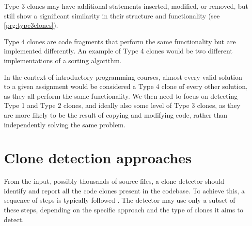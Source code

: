 Type 3 clones may have additional statements inserted, modified, or removed, but still show a significant similarity in their structure and functionality (see \autoref{prg:type3clones}).

Type 4 clones are code fragments that perform the same functionality but are implemented differently.
An example of Type 4 clones would be two different implementations of a sorting algorithm.

In the context of introductory programming courses, almost every valid solution to a given assignment would be considered a Type 4 clone of every other solution, as they all perform the same functionality.
We then need to focus on detecting Type 1 and Type 2 clones, and ideally also some level of Type 3 clones, as they are more likely to be the result of copying and modifying code, rather than independently solving the same problem.

\section{Clone detection approaches}

From the input, possibly thousands of source files, a clone detector should identify and report all the code clones present in the codebase.
To achieve this, a sequence of steps is typically followed \cite{roy09}.
The detector may use only a subset of these steps, depending on the specific approach and the type of clones it aims to detect.

